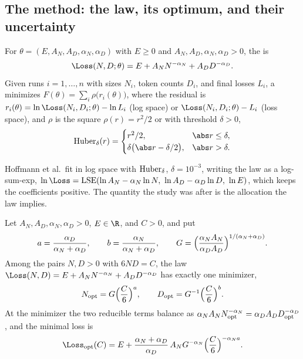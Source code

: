 \begin{refsection}
\section{The method: the law, its optimum, and their uncertainty}\label{sec:fitting:law}

\begin{definition}\label{def:fitting:law}
For $\theta=(E,A_N,A_D,\alpha_N,\alpha_D)$ with $E\ge0$ and $A_N,A_D,\alpha_N,\alpha_D>0$, the  is
\[
\Loss(N,D;\theta)=E+A_NN^{-\alpha_N}+A_DD^{-\alpha_D}.
\]
Given runs $i=1,\dots,n$ with sizes $N_i$, token counts $D_i$, and final losses $L_i$, a  minimizes $F(\theta)=\sum_i\rho\bigl(r_i(\theta)\bigr)$, where the residual is $r_i(\theta)=\ln\Loss(N_i,D_i;\theta)-\ln L_i$ (log space) or $\Loss(N_i,D_i;\theta)-L_i$ (loss space), and $\rho$ is the square $\rho(r)=r^2/2$ or  with threshold $\delta>0$,
\begin{equation}\label{eq:fitting:huber}
\fittingHuber_\delta(r)=\begin{cases}r^2/2,&\abs r\le\delta,\\ \delta\bigl(\abs r-\delta/2\bigr),&\abs r>\delta.\end{cases}
\end{equation}
\end{definition}

Hoffmann et al.\ fit in log space with $\operatorname{Huber}_\delta$, $\delta=10^{-3}$, writing the law as a log-sum-exp, $\ln\Loss=\fittingLSE(\ln A_N-\alpha_N\ln N,\ \ln A_D-\alpha_D\ln D,\ \ln E)$, which keeps the coefficients positive. The quantity the study was after is the allocation the law implies.

\begin{theorem}\label{thm:fitting:allocation}
Let $A_N,A_D,\alpha_N,\alpha_D>0$, $E\in\R$, and $C>0$, and put
\[
a=\frac{\alpha_D}{\alpha_N+\alpha_D},\qquad b=\frac{\alpha_N}{\alpha_N+\alpha_D},\qquad G=\Bigl(\frac{\alpha_NA_N}{\alpha_DA_D}\Bigr)^{1/(\alpha_N+\alpha_D)}.
\]
Among the pairs $N,D>0$ with $6ND=C$, the law $\Loss(N,D)=E+A_NN^{-\alpha_N}+A_DD^{-\alpha_D}$ has exactly one minimizer,
\begin{equation}\label{eq:fitting:opt}
N_{\mathrm{opt}}=G\Bigl(\frac C6\Bigr)^{a},\qquad D_{\mathrm{opt}}=G^{-1}\Bigl(\frac C6\Bigr)^{b}.
\end{equation}
At the minimizer the two reducible terms balance as $\alpha_NA_NN_{\mathrm{opt}}^{-\alpha_N}=\alpha_DA_DD_{\mathrm{opt}}^{-\alpha_D}$, and the minimal loss is
\[
\Loss_{\mathrm{opt}}(C)=E+\frac{\alpha_N+\alpha_D}{\alpha_D}\,A_NG^{-\alpha_N}\Bigl(\frac C6\Bigr)^{-\alpha_Na}.
\]
\end{theorem}


\end{refsection}
